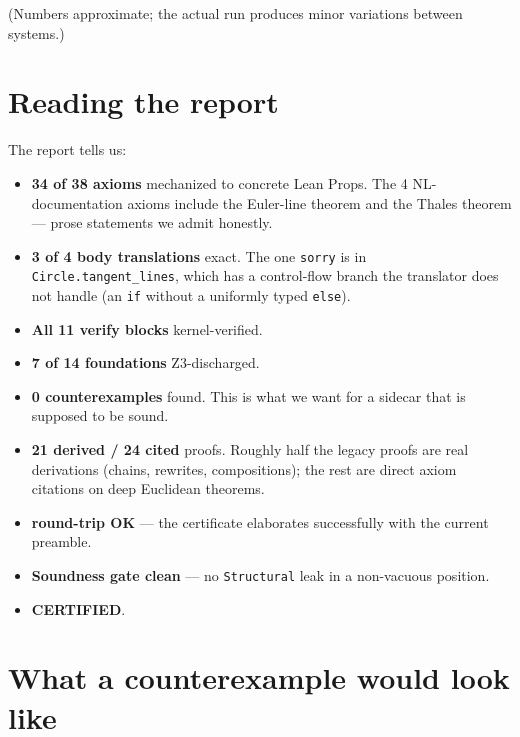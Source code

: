 (Numbers approximate; the actual run produces minor variations
between systems.)

\section{Reading the report}

The report tells us:

\begin{itemize}[leftmargin=1.7em]
  \item \textbf{34 of 38 axioms} mechanized to concrete Lean Props.
    The 4 NL-documentation axioms include the Euler-line theorem
    and the Thales theorem --- prose statements we admit honestly.

  \item \textbf{3 of 4 body translations} exact.  The one
    \texttt{sorry} is in \texttt{Circle.tangent\_lines}, which has
    a control-flow branch the translator does not handle (an
    \texttt{if} without a uniformly typed \texttt{else}).

  \item \textbf{All 11 verify blocks} kernel-verified.

  \item \textbf{7 of 14 foundations} Z3-discharged.

  \item \textbf{0 counterexamples} found.  This is what we want for
    a sidecar that is supposed to be sound.

  \item \textbf{21 derived / 24 cited} proofs.  Roughly half the
    legacy proofs are real derivations (chains, rewrites,
    compositions); the rest are direct axiom citations on deep
    Euclidean theorems.

  \item \textbf{\Lean{} round-trip OK} --- the certificate
    elaborates successfully with the current preamble.

  \item \textbf{Soundness gate clean} --- no \texttt{Structural}
    leak in a non-vacuous position.

  \item \textbf{CERTIFIED}.
\end{itemize}

\section{What a counterexample would look like}

